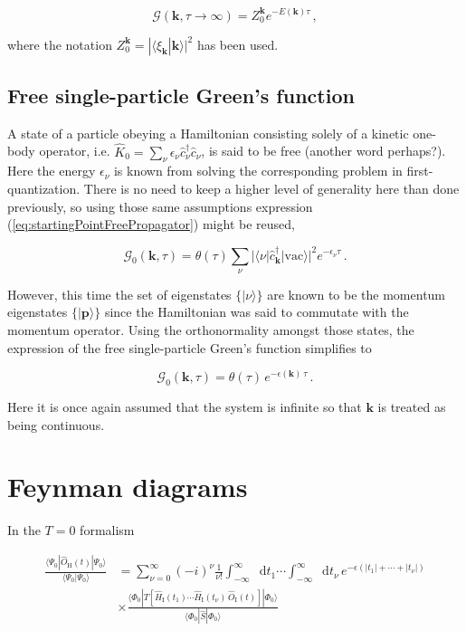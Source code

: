 \documentclass[12pt]{report}
\renewcommand{\vec}[1]{\boldsymbol{\mathbf{#1}}}                        %
\newcommand*\diff{\mathop{}\!\mathrm{d}}
\newcommand{\Gt}{\mathcal{G}}
\newcommand{\question}[1]{{\leavevmode\color{question}#1}}
\begin{document}
\begin{equation}
	\Gt(\vec k, \tau \rightarrow \infty) = Z_0^{\vec k} e^{- E(\vec k) \tau} \,,
\end{equation}

where the notation $ Z_0^{\vec k} = | \langle \xi_{\vec k} | \vec k \rangle |^2 $ has been used.

\subsection{Free single-particle Green's function}

A state of a particle obeying a Hamiltonian consisting solely of a kinetic one-body operator, i.e. $ \hat K_0 = \sum_\nu \epsilon_\nu \hat c^\dagger_\nu \hat c_\nu $, is said to be free \question{(another word perhaps?)}. Here the energy $ \epsilon_\nu $ is known from solving the corresponding problem in first-quantization. There is no need to keep a higher level of generality here than done previously, so using those same assumptions expression (\ref{eq:startingPointFreePropagator}) might be reused,

\begin{equation}
	\Gt_0(\vec k, \tau) = \theta(\tau)
	\sum_\nu | \langle \nu | \hat c^\dagger_{\vec k} | \text{vac} \rangle |^2 e^{-\epsilon_\nu \tau} \,.
\end{equation}

However, this time the set of eigenstates $ \{ | \nu \rangle \}  $ are known to be the momentum eigenstates $ \{ | \vec p \rangle \} $ since the Hamiltonian was said to commutate with the momentum operator. Using the orthonormality amongst those states, the expression of the free single-particle Green's function simplifies to

\begin{equation}
	\Gt_0(\vec k, \tau) = \theta(\tau) \, e^{-\epsilon(\vec k)  \, \tau} \,.
\end{equation}

Here it is once again assumed that the system is infinite so that $ \vec k $ is treated as being continuous.

\section{Feynman diagrams}


In the $ T = 0 $ formalism

\begin{equation}
	\begin{split}
		\frac{\langle \Psi_0 |  \hat O_\text{H}(t)  | \Psi_0 \rangle}{\langle \Psi_0  | \Psi_0 \rangle}
		&=
		\sum_{\nu = 0}^\infty \left( - i \right)^\nu \frac{1}{\nu !}
		\int_{-\infty}^{\infty} \diff t_1 \cdots \int_{-\infty}^{\infty} \diff t_\nu
		\, e^{- \epsilon \left( |t_1| + \cdots + |t_\nu| \right)} \\[1em]
		&\times \frac{\langle \Phi_0  | T[\hat H_\text{I} (t_1) \cdots \hat H_\text{I} (t_\nu) \, \hat O_\text{I}(t)] | \Phi_0 \rangle}{\langle \Phi_0  | \hat S |\Phi_0 \rangle}
	\end{split}
\end{equation}
\end{document}
